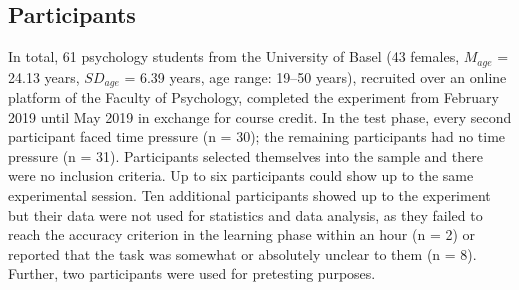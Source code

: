 \documentclass[a4paper,man,natbib]{apa6}
\begin{document}
\subsection{Participants}
In total, 61 psychology students from the University of Basel (43 females, $M_{age}$ = 24.13 years, $SD_{age}$ = 6.39 years, age range: 19--50 years), recruited over an online platform of the Faculty of Psychology, completed the experiment from February 2019 until May 2019 in exchange for course credit. In the test phase, every second participant faced time pressure (n = 30); the remaining participants had no time pressure (n = 31).
Participants selected themselves into the sample and there were no inclusion criteria. Up to six participants could show up to the same experimental session. Ten additional participants showed up to the experiment but their data were not used for statistics and data analysis, as they failed to reach the accuracy criterion in the learning phase within an hour (n = 2) or reported that the task was somewhat or absolutely unclear to them (n = 8). Further, two participants were used for pretesting purposes. 
\end{document}
